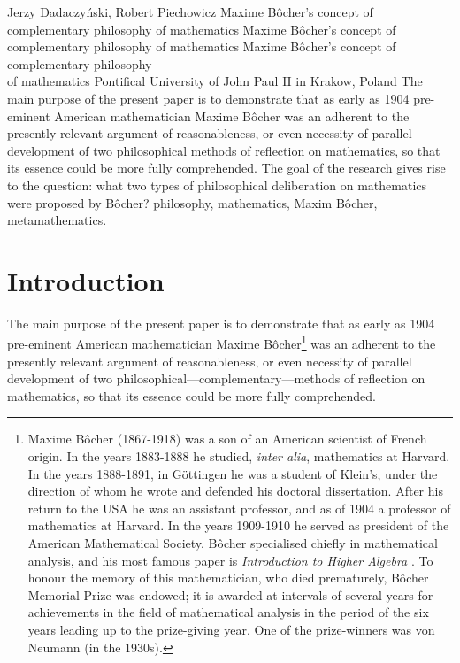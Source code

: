 \begin{artengenv}{Jerzy Dadaczyński, Robert Piechowicz}
	{Maxime Bôcher's concept of complementary philosophy of mathematics}
	{Maxime Bôcher's concept of complementary philosophy of mathematics}
	{Maxime Bôcher's concept of complementary philosophy\\of mathematics}
	{Pontifical University of John Paul II in Krakow, Poland}
	{The main purpose of the present paper is to demonstrate that as early as 1904 pre-eminent American mathematician Maxime Bôcher was an adherent to the presently relevant argument of reasonableness, or even necessity of parallel development of two philosophical methods of reflection on mathematics, so that its essence could be more fully comprehended. The goal of the research gives rise to the question: what two types of philosophical deliberation on mathematics were proposed by Bôcher?}
	{philosophy, mathematics, Maxim Bôcher, metamathematics.}
	




\section{Introduction}
\lettrine[loversize=0.13,lines=2,lraise=-0.05,nindent=0em,findent=0.2pt]%
{T}{}he main purpose of the present paper is to demonstrate that as early as 1904 pre-eminent American mathematician Maxime Bôcher\footnote{Maxime Bôcher (1867-1918) was a son of an American scientist of French origin. In the years 1883-1888 he studied, \textit{inter alia}, mathematics at Harvard. In the years 1888-1891, in Göttingen he was a student of Klein's, under the direction of whom he wrote and defended his doctoral dissertation. After his return to the USA he was an assistant professor, and as of 1904 a professor of mathematics at Harvard. In the years 1909-1910 he served as president of the American Mathematical Society. Bôcher specialised chiefly in mathematical analysis, and his most famous paper is \textit{Introduction to Higher Algebra}
\parencite[][]{bocher_introduction_1907}.
To honour the memory of this mathematician, who died prematurely, Bôcher Memorial Prize was endowed; it is awarded at intervals of several years for achievements in the field of mathematical analysis in the period of the six years leading up to the prize-giving year. One of the prize-winners was von Neumann (in the 1930s).} was an adherent to the presently relevant argument of reasonableness, or even necessity of parallel development of two philosophical---complementary---methods of reflection on mathematics, so that its essence could be more fully comprehended.


\end{artengenv}

